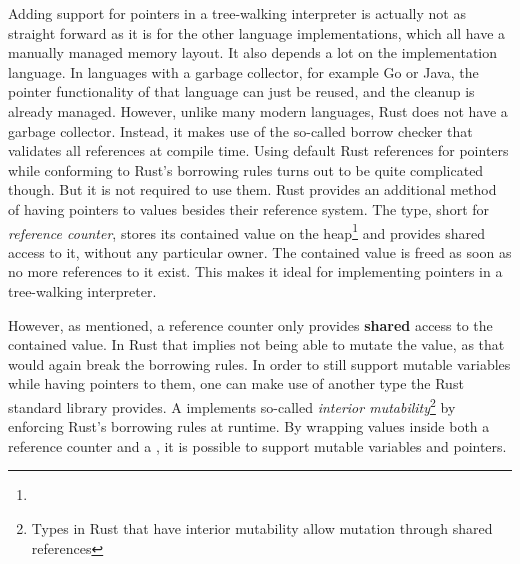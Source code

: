 Adding support for pointers in a tree-walking interpreter is actually not as straight forward as it is for the other language implementations, which all have a manually managed memory layout.
It also depends a lot on the implementation language.
In languages with a garbage collector, for example Go or Java, the pointer functionality of that language can just be reused, and the cleanup is already managed.
However, unlike many modern languages, Rust does not have a garbage collector.
Instead, it makes use of the so-called borrow checker that validates all references at compile time.
Using default Rust references for pointers while conforming to Rust's borrowing rules turns out to be quite complicated though.
But it is not required to use them.
Rust provides an additional method of having pointers to values besides their reference system.
The  type, short for \emph{reference counter}, stores its contained value on the heap\footnote{} and provides shared access to it, without any particular owner.
The contained value is freed as soon as no more references to it exist.
This makes it ideal for implementing pointers in a tree-walking interpreter.

However, as mentioned, a reference counter only provides \textbf{shared} access to the contained value.
In Rust that implies not being able to mutate the value, as that would again break the borrowing rules.
In order to still support mutable variables while having pointers to them, one can make use of another type the Rust standard library provides.
A  implements so-called \emph{interior mutability}\footnote{Types in Rust that have interior mutability allow mutation through shared references} by enforcing Rust's borrowing rules at runtime.
By wrapping values inside both a reference counter and a , it is possible to support mutable variables and pointers.
